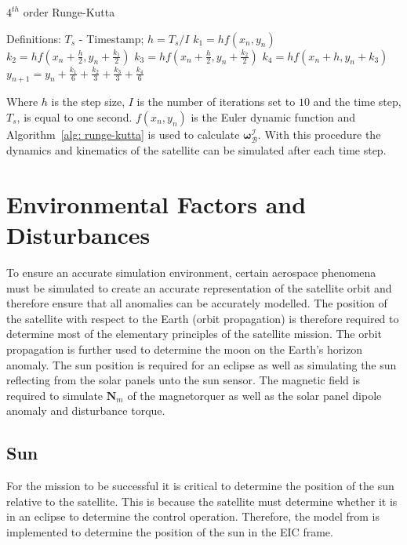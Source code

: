 \begin{algorithm}[!htb]
	\caption[$4^{th}$ order Runge-Kutta]{$4^{th}$ order Runge-Kutta}
	\label{alg: runge-kutta}
	\begin{algorithmic}[1]
		\State Definitions: $T_s$ - Timestamp; 
		\State $h = T_s/I$ 
		\State	$k_1 = hf(x_n, y_n)$
		\State	$k_2 = hf(x_n + \frac{h}{2}, y_n + \frac{k_1}{2})$
		\State	$k_3 = hf(x_n + \frac{h}{2}, y_n + \frac{k_2}{2})$
		\State	$k_4 = hf(x_n + h, y_n + k_3)$
		\State	$y_{n+1}=y_n + \frac{k_1}{6} + \frac{k_2}{3} + \frac{k_3}{3} + \frac{k_4}{6}$
		\EndFor

	\end{algorithmic}
\end{algorithm}

Where $h$ is the step size, $I$ is the number of iterations set to $10$ and the time step, $T_s$, is equal to one second. $f(x_n, y_n)$ is the Euler dynamic function and Algorithm~\ref{alg: runge-kutta} is used to calculate $\boldsymbol{\omega}_{\mathcal{B}}^{\mathcal{I}}$.  With this procedure the dynamics and kinematics of the satellite can be simulated after each time step.

\section{Environmental Factors and Disturbances}
To ensure an accurate simulation environment, certain aerospace phenomena must be simulated to create an accurate representation of the satellite orbit and therefore ensure that all anomalies can be accurately modelled. The position of the satellite with respect to the Earth (orbit propagation) is therefore required to determine most of the elementary principles of the satellite mission. The orbit propagation is further used to determine the moon on the Earth's horizon anomaly. The sun position is required for an eclipse as well as simulating the sun reflecting from the solar panels unto the sun sensor. The magnetic field is required to simulate $\mathbf{N}_m$ of the magnetorquer as well as the solar panel dipole anomaly and disturbance torque. 

\subsection{Sun}
For the mission to be successful it is critical to determine the position of the sun relative to the satellite. This is because the satellite must determine whether it is in an eclipse to determine the control operation. Therefore, the model from \cite{vallado2001fundamentals} is implemented to determine the position of the sun in the EIC frame.

